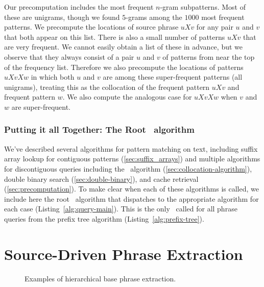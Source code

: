 Our precomputation includes the most frequent $n$-gram
subpatterns.  Most of these are unigrams, though
we found $5$-grams among the $1000$ most
frequent patterns.  We precompute the locations of
source phrase $uXv$ for any pair $u$ and $v$ that both
appear on this list.  There is also a small number of
patterns $uXv$ that are very frequent.
We cannot easily obtain a list of these in advance, but
we observe that they always consist of a pair $u$ and $v$ of patterns
from near the top of the frequency list.  Therefore
we also precompute the locations of patterns $uXvXw$
in which both $u$ and $v$ are among these super-frequent
patterns (all unigrams), treating this as the collocation of the 
frequent pattern $uXv$ and frequent pattern $w$.  We
also compute the analogous case for $uXvXw$ when 
$v$ and $w$ are super-frequent.

\subsubsection{Putting it all Together: The Root \queryfunc\ algorithm}

We've described several algorithms for pattern matching on text,
including suffix array lookup for contiguous patterns 
(\textsection\ref{sec:suffix_arrays}) and multiple
algorithms for discontiguous queries including the \queryfunc\ algorithm
(\textsection\ref{sec:collocation-algorithm}),
double binary search (\textsection\ref{sec:double-binary}), and cache retrieval
(\textsection\ref{sec:precomputation}).  To make clear when each
of these algorithms is called, we include here the root \queryfunc\
algorithm that dispatches to the appropriate algorithm for each case
(Listing~\ref{alg:query-main}).  This
is the only \queryfunc\ called for all phrase queries from the prefix tree
algorithm (Listing~\ref{alg:prefix-tree}).


\section{Source-Driven Phrase Extraction}\label{sec:hierarchical-extraction}

\figpreamble
\begin{figure}
	\figfontsize{
	\begin{center}
		
	\end{center}}
	\figpostamble
	\caption{Examples of hierarchical base phrase extraction.}
	\label{fig:base-phrase-extraction}
\end{figure}

